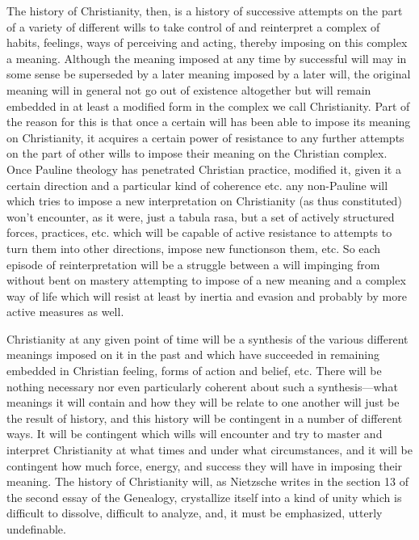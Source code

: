 The history of Christianity, then, is a history of successive attempts on the part of a variety of different wills to take control of and reinterpret a complex of habits, feelings, ways of perceiving and acting, thereby imposing on this complex a meaning. Although the meaning imposed at any time by successful will may in some sense be superseded by a later meaning imposed by a later will, the original meaning will in general not go out of existence altogether but will remain embedded in at least a modified form in the complex we call Christianity. Part of the reason for this is that once a certain will has been able to impose its meaning on Christianity, it acquires a certain power of resistance to any further attempts on the part of other wills to impose their meaning on the Christian complex. Once Pauline theology has penetrated Christian practice, modified it, given it a certain direction and a particular kind of coherence etc. any non-Pauline will which tries to impose a new interpretation on Christianity (as thus constituted) won't encounter, as it were, just a tabula rasa, but a set of actively structured forces, practices, etc. which will be capable of active resistance to attempts to turn them into other directions, impose new functionson them, etc. So each episode of reinterpretation will be a struggle between a will impinging from without bent on mastery attempting to impose of a new meaning and a complex way of life which will resist at least by inertia and evasion and probably by more active measures as well.

Christianity at any given point of time will be a synthesis of the various different meanings imposed on it in the past and which have succeeded in remaining embedded in Christian feeling, forms of action and belief, etc. There will be nothing necessary nor even particularly coherent about such a synthesis---what meanings it will contain and how they will be relate to one another will just be the result of history, and this history will be contingent in a number of different ways. It will be contingent which wills will encounter and try to master and interpret Christianity at what times and under what circumstances, and it will be contingent how much force, energy, and success they will have in imposing their meaning. The history of Christianity will, as Nietzsche writes in the section 13 of the second essay of the Genealogy,  crystallize itself into a kind of unity which is difficult to dissolve, difficult to analyze, and, it must be emphasized, utterly undefinable.

